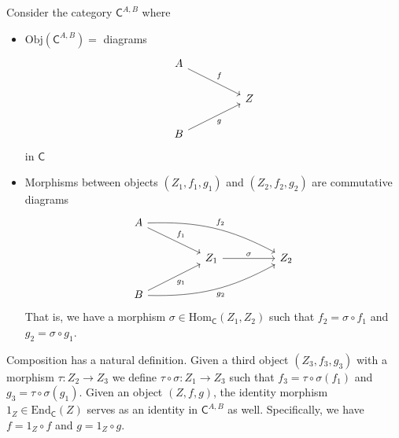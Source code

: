 \documentclass[../../master.tex]{subfiles}
\begin{document}
    \begin{solution}
      Consider the category \(\mathsf{C}^{A, B}\) where
      \begin{itemize}
        \item \(\text{Obj}(\mathsf{C}^{A, B}) =\) diagrams
        \[
        \begin{tikzcd}
	        {A} \\
	        && {Z} \\
	        {B}
	        \arrow["{f}", from=1-1, to=2-3]
	        \arrow["{g}"', from=3-1, to=2-3]
        \end{tikzcd}
        \]
        in \(\mathsf{C}\)
        \item Morphisms between objects \((Z_{1}, f_{1}, g_{1})\) and \((Z_{2}, f_{2}, g_{2})\) are commutative diagrams
        \[
        \begin{tikzcd}
	        {A} \\
	        && {Z_{1}} && {Z_{2}} \\
	        {B}
	        \arrow["{f_{1}}", from=1-1, to=2-3]
	        \arrow["{g_{1}}"', from=3-1, to=2-3]
	        \arrow["{f_{2}}", from=1-1, to=2-5, bend left=15]
	        \arrow["{g_{2}}"', from=3-1, to=2-5, bend right=15]
	        \arrow["{\sigma}", from=2-3, to=2-5]
        \end{tikzcd}
        \]
        That is, we have a morphism \(\sigma \in \text{Hom}_{\mathsf{C}}(Z_{1}, Z_{2})\) such that
        \(f_{2} = \sigma \circ f_{1}\) and \(g_{2} = \sigma \circ g_{1}\).
      \end{itemize}
      Composition has a natural definition.
      Given a third object \((Z_{3}, f_{3}, g_{3})\) with a morphism \(\tau: Z_{2} \to Z_{3}\) we define \(\tau \circ \sigma: Z_{1} \to Z_{3}\)
      such that \(f_{3} = \tau \circ \sigma (f_{1})\) and \(g_{3} = \tau \circ \sigma (g_{1})\).
      Given an object \((Z, f, g)\), the identity morphism \(1_{Z} \in \text{End}_{\mathsf{C}}(Z)\) serves as an identity in \(\mathsf{C}^{A, B}\) as well.
      Specifically, we have \(f = 1_{Z} \circ f\) and \(g = 1_{Z} \circ g\).


\end{solution}
\end{document}
